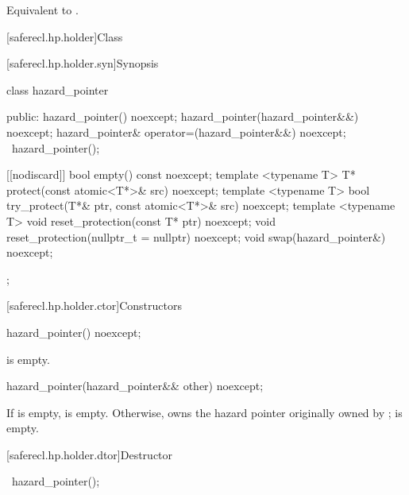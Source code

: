 \begin{itemdescr}

\pnum
\effects 
Equivalent to .

\end{itemdescr}

[saferecl.hp.holder]{Class }

[saferecl.hp.holder.syn]{Synopsis}

\begin{codeblock}
class hazard_pointer {
public:
  hazard_pointer() noexcept;
  hazard_pointer(hazard_pointer&&) noexcept;
  hazard_pointer& operator=(hazard_pointer&&) noexcept;
  ~hazard_pointer();
  
  [[nodiscard]] bool empty() const noexcept;
  template <typename T> T* protect(const atomic<T*>& src) noexcept;  
  template <typename T> bool try_protect(T*& ptr, const atomic<T*>& src) noexcept;
  template <typename T> void reset_protection(const T* ptr) noexcept;
  void reset_protection(nullptr_t = nullptr) noexcept;
  void swap(hazard_pointer&) noexcept;
};
\end{codeblock}

[saferecl.hp.holder.ctor]{Constructors}

\begin{itemdecl}
hazard_pointer() noexcept;
\end{itemdecl}

\begin{itemdescr}

\pnum
\ensures 
{} is empty.

\end{itemdescr}

\begin{itemdecl}
hazard_pointer(hazard_pointer&& other) noexcept;
\end{itemdecl}

\begin{itemdescr}

\pnum
\ensures 
If  is empty,  is empty. Otherwise,  owns the hazard pointer originally owned by ;  is empty.

\end{itemdescr}

[saferecl.hp.holder.dtor]{Destructor}

\begin{itemdecl}
~hazard_pointer();
\end{itemdecl}

